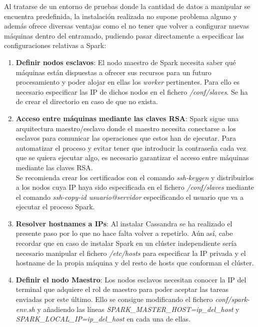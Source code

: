Al tratarse de un entorno de pruebas donde la cantidad de datos a manipular se encuentra predefinida, la instalación realizada no supone problema alguno y además ofrece diversas ventajas como el no tener que volver a configurar nuevas máquinas dentro del entramado, pudiendo pasar directamente a especificar las configuraciones relativas a Spark:

\begin{enumerate}
	
\item \textbf{Definir nodos esclavos}: El nodo maestro de Spark necesita saber qué máquinas están dispuestas a ofrecer sus recursos para un futuro procesamiento y poder alojar en ellas los \textit{worker} pertinentes. Para ello es necesario especificar las IP de dichos nodos en el fichero \textit{/conf/slaves}. Se ha de crear el directorio en caso de que no exista.

\clearpage

\item \textbf{Acceso entre máquinas mediante las claves RSA}: Spark sigue una arquitectura maestro/esclavo donde el maestro necesita conectarse a los esclavos para comunicar las operaciones que estos han de ejecutar. Para automatizar el proceso y evitar tener que introducir la contraseña cada vez que se quiera ejecutar algo, es necesario garantizar el acceso entre máquinas mediante las claves RSA.\\

Se recomienda crear los certificados con el comando \textit{ssh-keygen} y distribuirlos a los nodos cuya IP haya sido especificada en el fichero \textit{/conf/slaves} mediante el comando \textit{ssh-copy-id {usuario}@{servidor}} especificando el usuario que va a ejecutar el proceso Spark.

\item \textbf{Resolver hostnames a IPs}: Al instalar Cassandra se ha realizado el presente paso por lo que no hace falta volver a repetirlo. Aún así, cabe recordar que en caso de instalar Spark en un clúster independiente sería necesario manipular el fichero \textit{/etc/hosts} para especificar la IP privada y el hostname de la propia máquina y del resto de hosts que conforman el clúster.

\item \textbf{Definir el nodo Maestro}: Los nodos esclavos necesitan conocer la IP del terminal que adquiere el rol de maestro para poder aceptar las tareas enviadas por este último. Ello se consigue modificando  el fichero \textit{conf/spark-env.sh} y añadiendo las líneas \textit{SPARK\_MASTER\_HOST=ip\_del\_host} y \textit{SPARK\_LOCAL\_IP=ip\_del\_host} en cada una de ellas.
	
\end{enumerate}

